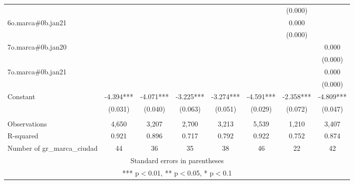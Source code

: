 \begin{tabular}{lccccccc}
 &  &  &  &  &  & (0.000) &  \\
6o.marca\#0b.jan21 &  &  &  &  &  & 0.000 &  \\
 &  &  &  &  &  & (0.000) &  \\
7o.marca\#0b.jan20 &  &  &  &  &  &  & 0.000 \\
 &  &  &  &  &  &  & (0.000) \\
7o.marca\#0b.jan21 &  &  &  &  &  &  & 0.000 \\
 &  &  &  &  &  &  & (0.000) \\
Constant & -4.394*** & -4.071*** & -3.225*** & -3.274*** & -4.591*** & -2.358*** & -4.809*** \\
 & (0.031) & (0.040) & (0.063) & (0.051) & (0.029) & (0.072) & (0.047) \\
 &  &  &  &  &  &  &  \\
Observations & 4,650 & 3,207 & 2,700 & 3,213 & 5,539 & 1,210 & 3,407 \\
R-squared & 0.921 & 0.896 & 0.717 & 0.792 & 0.922 & 0.752 & 0.874 \\
 Number of gr\_marca\_ciudad & 44 & 36 & 35 & 38 & 46 & 22 & 42 \\ \hline
\multicolumn{8}{c}{ Standard errors in parentheses} \\
\multicolumn{8}{c}{ *** p$<$0.01, ** p$<$0.05, * p$<$0.1} \\
\end{tabular}
